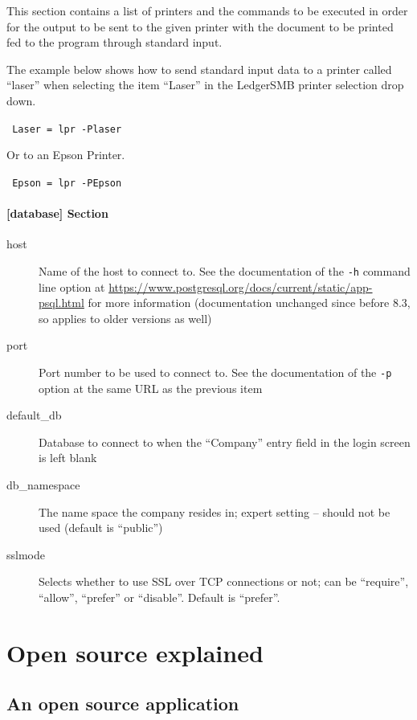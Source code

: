 This section contains a list of printers and the commands
to be executed in order for the output to be sent to the given printer with
the document to be printed fed to the program through standard input.

The example below shows how to send standard input data to a printer called ``laser''
when selecting the item ``Laser'' in the LedgerSMB printer selection drop down.

\texttt{
        Laser    = lpr -Plaser
}

Or to an Epson Printer.

\texttt{
        Epson   = lpr -PEpson
}


\subsubsection{[database] Section}
\label{subsubsec-global-config-ledgersmb-conf-database}

\begin{description}
        \item [host] Name of the host to connect to. See the documentation of the {\tt -h} command line option at 
        \url{https://www.postgresql.org/docs/current/static/app-psql.html}
        for more information (documentation unchanged since before 8.3, so applies to older versions as well)
        \item [port] Port number to be used to connect to. See the documentation of the {\tt -p} option at the
        same URL as the previous item
        \item [default\_db] Database to connect to when the ``Company'' entry field in the login screen is left blank
        \item [db\_namespace] The name space the company resides in; expert setting -- should not be used (default is
        ``public'')
        \item [sslmode] Selects whether to use \gls{SSL} over TCP connections or not; can be ``require'', ``allow'',
        ``prefer'' or ``disable''.  Default is ``prefer''.
\end{description}

\chapter{Open source explained}
\label{app-open-source-explained}

\section{An open source application}
\label{sec-open-source-application}

